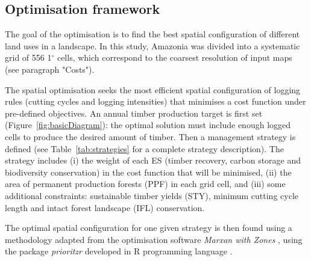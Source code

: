 \documentclass{article}
\begin{document}
\subsection{Optimisation framework}

The goal of the optimisation is to find the best spatial configuration of different land uses in a landscape. In this study, Amazonia was divided into a systematic grid of 556 1$^{\circ}$ cells, which correspond to the coarsest resolution of input maps (see paragraph "Costs"). 

The spatial optimisation seeks the most efficient spatial configuration of logging rules (cutting cycles and logging intensities) that minimises a cost function under pre-defined objectives. An annual timber production target is first set (Figure~\ref{fig:basicDiagram}): the optimal solution must include enough logged cells to produce the desired amount of timber. Then a management strategy is defined (see Table~\ref{tab:strategies} for a complete strategy description). The strategy includes (i) the weight of each ES (timber recovery, carbon storage and biodiversity conservation) in the cost function that will be minimised, (ii) the area of permanent production forests (PPF) in each grid cell, and (iii) some additional constraints: sustainable timber yields (STY), minimum cutting cycle length and intact forest landscape (IFL) conservation. 

The optimal spatial configuration for one given strategy is then found using a methodology adapted from the optimisation software \textit{Marxan with Zones} \cite{Watts2009}, using the package \textit{prioritzr} \cite{Hanson2018} developed in R programming language \cite{RCoreTeam2017}. 
\end{document}
